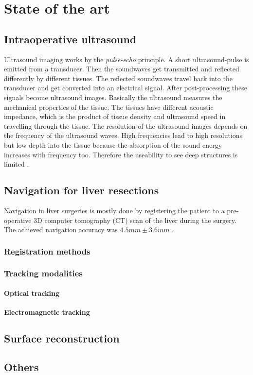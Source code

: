 \chapter{State of the art}

\section{Intraoperative ultrasound}
Ultrasound imaging works by the \textit{pulse-echo} principle. A short
ultrasound-pulse is emitted from a transducer. Then the soundwaves get
transmitted and reflected differently by different tissues. The reflected
soundwaves travel back into the transducer and get converted into an electrical
signal. After post-processing these signals become ultrasound images. Basically
the ultrasound measures the mechanical properties of the tissue. The tissues
have different acoustic impedance, which is the product of tissue density and
ultrasound speed in travelling through the tissue. The resolution of the
ultrasound images depends on the frequency of the ultrasound waves. High
frequencies lead to high resolutions but low depth into the tissue because the
absorption of the sound energy increases with frequency too. Therefore the
useability to see deep structures is limited \cite{torzilli2014ultrasound}.

\section{Navigation for liver resections}
Navigation in liver surgeries is mostly done by registering the patient to a pre-operative 3D
computer tomography (CT) scan of the liver during the surgery. The achieved
navigation accuracy was $4.5 mm \pm3.6 mm$ \cite{peterhans2011navigation}.

\subsection{Registration methods}
\subsection{Tracking modalities}
\subsubsection{Optical tracking}
\subsubsection{Electromagnetic tracking}
\section{Surface reconstruction}
\section{Others}

\endinput
